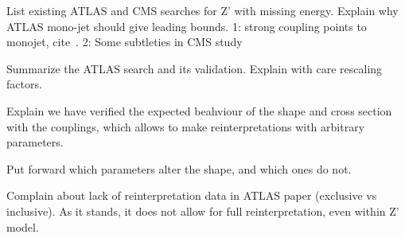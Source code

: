 List existing ATLAS and CMS searches for Z' with missing energy. Explain why ATLAS mono-jet should give leading bounds.
1: strong coupling points to monojet, cite~\cite{Bernreuther:2018nat}. 2: Some subtleties in CMS study 

Summarize the ATLAS search and its validation. Explain with care rescaling factors.

Explain we have verified the expected beahviour of the shape and cross section with the couplings, which allows to make reinterpretations with arbitrary parameters.

Put forward which parameters alter the shape, and which ones do not.

Complain about lack of reinterpretation data in ATLAS paper (exclusive vs inclusive). As it stands, it does not allow for full reinterpretation, even within Z' model.